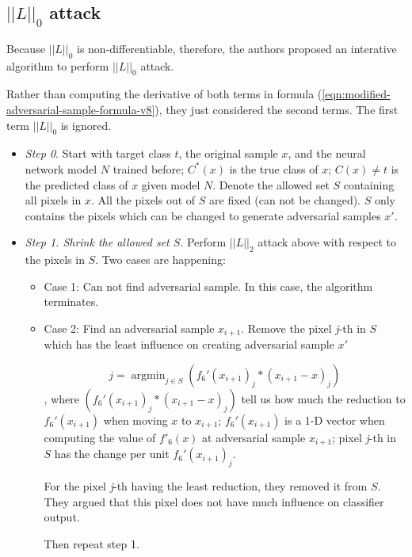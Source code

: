 \documentclass[12pt]{article}
\DeclareMathOperator*{\argmin}{argmin}
\begin{document}
\subsection{$||L||_0$ attack}
Because $||L||_0$ is non-differentiable, therefore, the authors proposed an interative algorithm to perform $||L||_0$ attack.

Rather than computing the derivative of both terms in formula (\ref{eqn:modified-adversarial-sample-formula-v8}), they just considered the second terms. The first term $||L||_0$ is ignored.

\begin{itemize}
	\item \textit{Step 0}. Start with target class $t$, the original sample $x$, and the neural network model $N$ trained before; $C^*(x) $ is the true class of $x$; $C(x) \ne t$ is the predicted class of $x$ given model $N$. Denote the allowed set $S$ containing all pixels in $x$. All the pixels out of $S$ are fixed (can not be changed). $S$ only contains the pixels which can be changed to generate adversarial samples $x'$.
	
	\item \textit{Step 1. Shrink the allowed set $S$}.     Perform $||L||_2$ attack above with respect to the pixels in $S$. Two cases are happening:
	\begin{itemize}
		\item Case 1: Can not find adversarial sample. In this case, the algorithm terminates.
		\item Case 2: Find an adversarial sample $x_{i+1}$. Remove the pixel \textit{j}-th in $S$ which has the least influence on creating adversarial sample $x'$
		
		\begin{equation}
		j = \argmin_{j \in S} (f_6'(x_{i+1})_j * (x_{i+1} - x)_j)
		\end{equation}
		, where $(f_6'(x_{i+1})_j * (x_{i+1} - x)_j)$ tell us how much the reduction to $f_6'(x_{i+1})$ when moving $x$ to $x_{i+1}$; $f_6'(x_{i+1})$ is a 1-D vector when computing the value of $f'_6(x)$ at adversarial sample $x_{i+1}$; pixel \textit{j}-th in $S$ has the change per unit $f_6'(x_{i+1})_j$. 
		
		For the pixel \textit{j}-th having the least reduction, they removed it from $S$. They argued that this pixel does not have much influence on classifier output.
		
		Then repeat step 1.
	\end{itemize}
	
\end{itemize}
\end{document}
